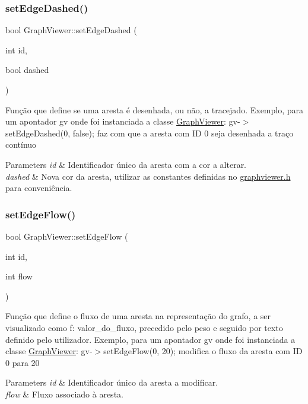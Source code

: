 \subsubsection{\texorpdfstring{set\+Edge\+Dashed()}{setEdgeDashed()}}
{\footnotesize\ttfamily bool Graph\+Viewer\+::set\+Edge\+Dashed (\begin{DoxyParamCaption}\item[{int}]{id,  }\item[{bool}]{dashed }\end{DoxyParamCaption})}

Função que define se uma aresta é desenhada, ou não, a tracejado. Exemplo, para um apontador gv onde foi instanciada a classe \hyperlink{class_graph_viewer}{Graph\+Viewer}\+: gv-\/$>$set\+Edge\+Dashed(0, false); faz com que a aresta com ID 0 seja desenhada a traço contínuo


\begin{DoxyParams}{Parameters}
{\em id} & Identificador único da aresta com a cor a alterar. \\
\hline
{\em dashed} & Nova cor da aresta, utilizar as constantes definidas no \hyperlink{graphviewer_8h_source}{graphviewer.\+h} para conveniência. \\
\hline
\end{DoxyParams}
\hypertarget{class_graph_viewer_a69eb065145063e4dea41961e92e35c8e}{}\label{class_graph_viewer_a69eb065145063e4dea41961e92e35c8e} 
\subsubsection{\texorpdfstring{set\+Edge\+Flow()}{setEdgeFlow()}}
{\footnotesize\ttfamily bool Graph\+Viewer\+::set\+Edge\+Flow (\begin{DoxyParamCaption}\item[{int}]{id,  }\item[{int}]{flow }\end{DoxyParamCaption})}

Função que define o fluxo de uma aresta na representação do grafo, a ser visualizado como f\+: valor\+\_\+do\+\_\+fluxo, precedido pelo peso e seguido por texto definido pelo utilizador. Exemplo, para um apontador gv onde foi instanciada a classe \hyperlink{class_graph_viewer}{Graph\+Viewer}\+: gv-\/$>$set\+Edge\+Flow(0, 20); modifica o fluxo da aresta com ID 0 para 20


\begin{DoxyParams}{Parameters}
{\em id} & Identificador único da aresta a modificar. \\
\hline
{\em flow} & Fluxo associado à aresta. \\
\hline
\end{DoxyParams}
\hypertarget{class_graph_viewer_a447cca0064e785654c2105602c2961ca}{}\label{class_graph_viewer_a447cca0064e785654c2105602c2961ca} 
